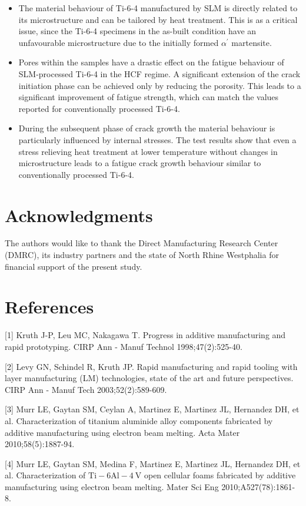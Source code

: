 \documentclass[10pt]{article}
\begin{document}
\begin{itemize}
  \item The material behaviour of Ti-6-4 manufactured by SLM is directly related to its microstructure and can be tailored by heat treatment. This is as a critical issue, since the Ti-6-4 specimens in the as-built condition have an unfavourable microstructure due to the initially formed $\alpha^{\prime}$ martensite.
  \item Pores within the samples have a drastic effect on the fatigue behaviour of SLM-processed Ti-6-4 in the HCF regime. A significant extension of the crack initiation phase can be achieved only by reducing the porosity. This leads to a significant improvement of fatigue strength, which can match the values reported for conventionally processed Ti-6-4.
  \item During the subsequent phase of crack growth the material behaviour is particularly influenced by internal stresses. The test results show that even a stress relieving heat treatment at lower temperature without changes in microstructure leads to a fatigue crack growth behaviour similar to conventionally processed Ti-6-4.
\end{itemize}

\section*{Acknowledgments}
The authors would like to thank the Direct Manufacturing Research Center (DMRC), its industry partners and the state of North Rhine Westphalia for financial support of the present study.

\section*{References}
[1] Kruth J-P, Leu MC, Nakagawa T. Progress in additive manufacturing and rapid prototyping. CIRP Ann - Manuf Technol 1998;47(2):525-40.

[2] Levy GN, Schindel R, Kruth JP. Rapid manufacturing and rapid tooling with layer manufacturing (LM) technologies, state of the art and future perspectives. CIRP Ann - Manuf Tech 2003;52(2):589-609.

[3] Murr LE, Gaytan SM, Ceylan A, Martinez E, Martinez JL, Hernandez DH, et al. Characterization of titanium aluminide alloy components fabricated by additive manufacturing using electron beam melting. Acta Mater 2010;58(5):1887-94.

[4] Murr LE, Gaytan SM, Medina F, Martinez E, Martinez JL, Hernandez DH, et al. Characterization of $\mathrm{Ti}-6 \mathrm{Al}-4 \mathrm{~V}$ open cellular foams fabricated by additive manufacturing using electron beam melting. Mater Sci Eng 2010;A527(78):1861-8.
\end{document}
